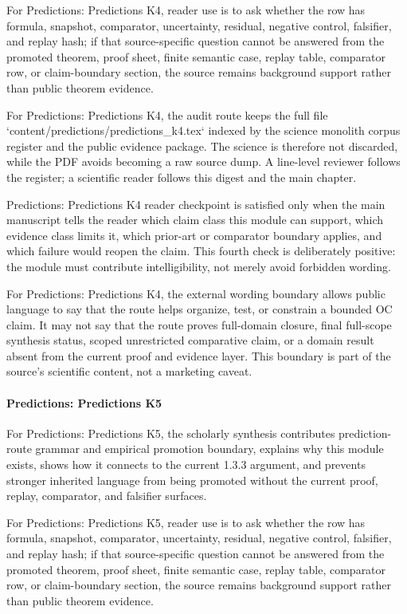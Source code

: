 For Predictions: Predictions K4, reader use is to ask whether the row has formula, snapshot, comparator, uncertainty, residual, negative control, falsifier, and replay hash; if that source-specific question cannot be answered from the promoted theorem, proof sheet, finite semantic case, replay table, comparator row, or claim-boundary section, the source remains background support rather than public theorem evidence.


For Predictions: Predictions K4, the audit route keeps the full file `content/predictions/predictions\_k4.tex` indexed by the science monolith corpus register and the public evidence package. The science is therefore not discarded, while the PDF avoids becoming a raw source dump. A line-level reviewer follows the register; a scientific reader follows this digest and the main chapter.


Predictions: Predictions K4 reader checkpoint is satisfied only when the main manuscript tells the reader which claim class this module can support, which evidence class limits it, which prior-art or comparator boundary applies, and which failure would reopen the claim. This fourth check is deliberately positive: the module must contribute intelligibility, not merely avoid forbidden wording.


For Predictions: Predictions K4, the external wording boundary allows public language to say that the route helps organize, test, or constrain a bounded OC claim. It may not say that the route proves full-domain closure, final full-scope synthesis status, scoped unrestricted comparative claim, or a domain result absent from the current proof and evidence layer. This boundary is part of the source's scientific content, not a marketing caveat.


\paragraph{Predictions: Predictions K5}

For Predictions: Predictions K5, the scholarly synthesis contributes prediction-route grammar and empirical promotion boundary, explains why this module exists, shows how it connects to the current 1.3.3 argument, and prevents stronger inherited language from being promoted without the current proof, replay, comparator, and falsifier surfaces.


For Predictions: Predictions K5, reader use is to ask whether the row has formula, snapshot, comparator, uncertainty, residual, negative control, falsifier, and replay hash; if that source-specific question cannot be answered from the promoted theorem, proof sheet, finite semantic case, replay table, comparator row, or claim-boundary section, the source remains background support rather than public theorem evidence.


